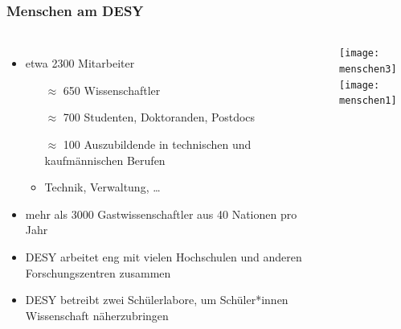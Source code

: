 \documentclass[10pt,t]{beamer}
\begin{document}
\begin{frame}
\frametitle{Menschen am DESY}
\vspace*{-2\baselineskip}
\begin{columns}[c]
\begin{itemize}
    \item etwa 2300 Mitarbeiter
    \begin{itemize}
        \item[$\approx\!$] 650 Wissenschaftler
        \item[$\approx\!$] 700 Studenten, Doktoranden, Postdocs
        \item[$\approx\!$] 100 Auszubildende in technischen und kaufmännischen Berufen
        \item Technik, Verwaltung, \dots
    \end{itemize}
    \item mehr als 3000 Gastwissenschaftler aus 40 Nationen pro Jahr
    \item DESY arbeitet eng mit vielen Hochschulen und anderen Forschungszentren zusammen
    \item DESY betreibt zwei Schülerlabore, um Schüler*innen Wissenschaft näherzubringen
\end{itemize}
    \texttt{[image: menschen3]} \\[1ex]
    \texttt{[image: menschen1]} \vspace*{-1cm}
\end{columns}
\end{frame}
\end{document}
